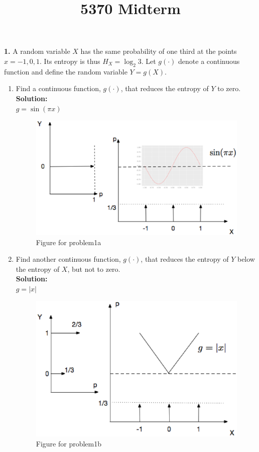 \documentclass{assignment}
\begin{document}
\title{5370 Midterm}

\textbf{1.} A random variable $X$ has the same probability of one third at the points $x=-1,0,1.$  Its entropy is thus $H_X = \log_2 3.$ Let $g(\cdot) $ denote a continuous function and define the random variable $Y=g(X)$.
\begin{enumerate}
\item  Find a continuous function, $g(\cdot )$, that reduces the entropy of $Y$ to zero. \\
  \textbf{Solution:} \\
  $g = \sin(\pi x)$
  \begin{figure}[!h]
  \centering
  \includegraphics[width=5in]{pics/problem1a.eps}
  \caption{Figure for problem1a}
  \label{fig:problem1a}
  \end{figure}

\item  Find another continuous function, $g(\cdot )$, that reduces the entropy of $Y$ below the entropy of $X$,
  but not to zero. \\
  \textbf{Solution:} \\
  $g = |x|$
  \begin{figure}[!h]
  \centering
  \includegraphics[width=5in]{pics/problem1b.eps}
  \caption{Figure for problem1b}
  \label{fig:problem1b}
  \end{figure}


\end{enumerate}
\end{document}
